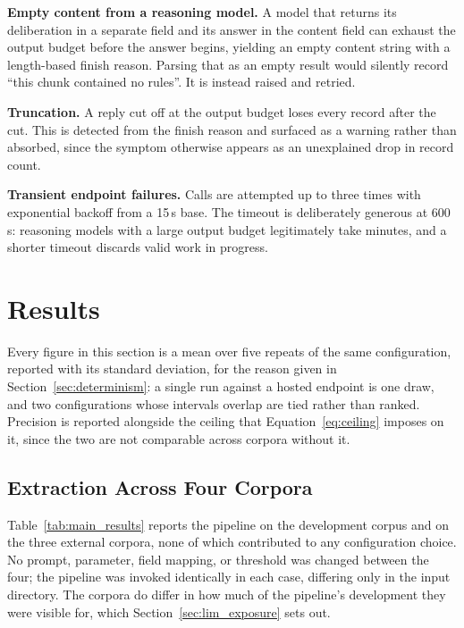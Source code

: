 \documentclass[11pt]{article}
\begin{document}
\textbf{Empty content from a reasoning model.} A model that returns its
deliberation in a separate field and its answer in the content field can exhaust
the output budget before the answer begins, yielding an empty content string with
a length-based finish reason. Parsing that as an empty result would silently
record ``this chunk contained no rules''. It is instead raised and retried.

\textbf{Truncation.} A reply cut off at the output budget loses every record
after the cut. This is detected from the finish reason and surfaced as a warning
rather than absorbed, since the symptom otherwise appears as an unexplained drop
in record count.

\textbf{Transient endpoint failures.} Calls are attempted up to three times with
exponential backoff from a 15\,s base. The timeout is deliberately generous at
600\,s: reasoning models with a large output budget legitimately take minutes,
and a shorter timeout discards valid work in progress.


\section{Results}
\label{sec:results}

Every figure in this section is a mean over five repeats of the same
configuration, reported with its standard deviation, for the reason given in
Section~\ref{sec:determinism}: a single run against a hosted endpoint is one
draw, and two configurations whose intervals overlap are tied rather than ranked.
Precision is reported alongside the ceiling that Equation~\ref{eq:ceiling}
imposes on it, since the two are not comparable across corpora without it.

\subsection{Extraction Across Four Corpora}
\label{sec:results_main}

Table~\ref{tab:main_results} reports the pipeline on the development corpus and
on the three external corpora, none of which contributed to any configuration
choice. No prompt, parameter, field mapping, or threshold was changed between the
four; the pipeline was invoked identically in each case, differing only in the
input directory. The corpora do differ in how much of the pipeline's development
they were visible for, which Section~\ref{sec:lim_exposure} sets out.
\end{document}
